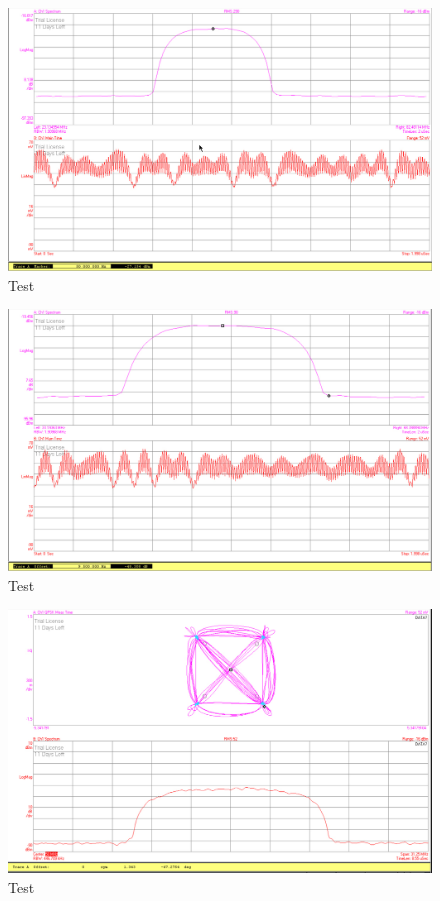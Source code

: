 \documentclass[12pt,a4paper,ngerman]{article}
\begin{document}
\begin{figure}[H]
\centering
\includegraphics[width=\textwidth]{figures/Aufgabe1_QPSK_avg.jpg} 
\caption{Test}
\end{figure}

\begin{figure}[H]
\centering
\includegraphics[width=\textwidth]{figures/Aufgabe1_QPSK_B.jpg} 
\caption{Test}
\end{figure}

\begin{figure}[H]
\centering
\includegraphics[width=\textwidth]{figures/Aufgabe1_QPSK_demod.jpg} 
\caption{Test}
\end{figure}
\end{document}

